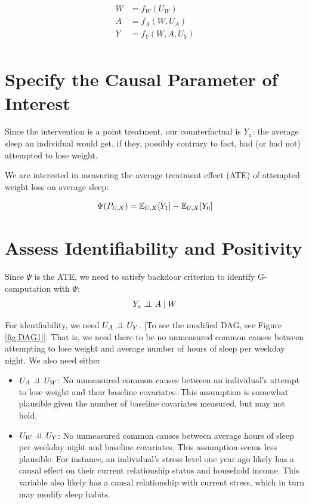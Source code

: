 \documentclass{article}
\begin{document}
\begin{align*}
W &= f_{W}(U_{W}) \\
A &= f_{A}(W,U_{A}) \\
Y &= f_{Y}(W,A,U_{Y}) \\
\end{align*}


\section{Specify the Causal Parameter of Interest}

Since the intervention is a point treatment, our counterfactual is $Y_{a}$: the average sleep an individual would get, if they, possibly contrary to fact, had (or had not) attempted to lose weight.

We are interested in measuring the average treatment effect (ATE) of attempted weight loss on average sleep:

$$\Psi(P_{U,X}) = \mathbb{E}_{U,X}[Y_1] - \mathbb{E}_{U,X}[Y_0]$$

\section{Assess Identifiability and Positivity}
\label{sec:assumptions}

Since $\Psi$ is the ATE, we need to satisfy backdoor criterion to identify G-computation with $\Psi$:
   $$Y_{a} \perp\hspace{-5pt}\perp A \mid W$$

For identfiability, we need $U_{A} \perp\hspace{-5pt}\perp U_{Y}$. [To see the modified DAG, see Figure \ref{fig:DAG1}].  That is, we need there to be no unmeasured common causes between attempting to lose weight and average number of hours of sleep per weekday night. We also need either 
    \begin{itemize}
      \item $U_{A} \perp\hspace{-5pt}\perp U_{W}$: No unmeasured common causes between an individual's attempt to lose weight and their baseline covariates. This assumption is somewhat plausible given the number of baseline covariates measured, but may not hold.
      \item $U_{W} \perp\hspace{-5pt}\perp U_{Y}$: No unmeasured common causes between average hours of sleep per weekday night and baseline covariates. This assumption seems less plausible. For instance, an individual's stress level one year ago likely has a causal effect on their current relationship status and household income. This variable also likely has a causal relationship with current stress, which in turn may modify sleep habits.
    \end{itemize}
\end{document}
